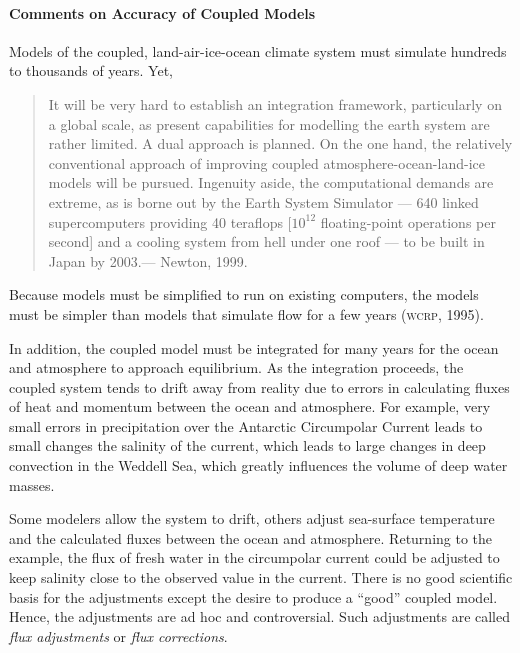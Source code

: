 \paragraph{Comments on Accuracy of Coupled Models}
Models of the coupled,
land-air-ice-ocean climate system must simulate hundreds to thousands
of years. Yet,
\begin{quote} \small
It will be very hard to establish an integration framework,
particularly on a global scale, as present capabilities for modelling
the earth system are rather limited. A dual approach is planned. On
the one hand, the relatively conventional approach of improving
coupled atmosphere-ocean-land-ice models will be pursued.  Ingenuity
aside, the computational demands are extreme, as is borne out by the
Earth System Simulator --- 640 linked supercomputers providing 40
teraflops [$10^{12}$ floating-point operations per second] and a
cooling system from hell under one roof --- to be built in Japan by
2003.--- Newton, 1999.
\end{quote}
Because models must be simplified to run on existing computers, the
models must be simpler than models that simulate flow for a few years
(\textsc{wcrp}, 1995).

In addition, the coupled model must be integrated for many years for
the ocean and atmosphere to approach equilibrium. As the integration
proceeds, the coupled system tends to drift away from reality due to
errors in calculating fluxes of heat and momentum between the ocean
and atmosphere. For example, very small errors in precipitation over
the Antarctic Circumpolar Current
leads to small changes the salinity of the current, which leads to
large changes in deep convection in the Weddell Sea, which greatly
influences the volume of deep water masses.

Some modelers allow the system to drift, others adjust sea-surface
temperature and the calculated fluxes between the ocean and
atmosphere. Returning to the example, the flux of fresh water in the
circumpolar current could be adjusted to keep salinity close to the
observed value in the current. There is no good scientific basis for
the adjustments except the desire to produce a ``good'' coupled
model. Hence, the adjustments are ad hoc and controversial. Such
adjustments are called \textit{flux adjustments} or \textit{flux corrections}.

